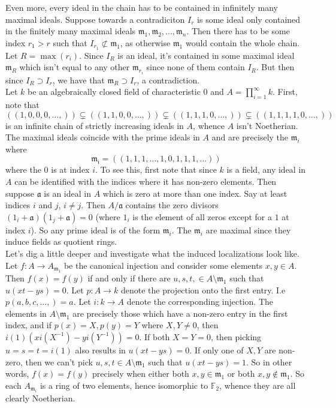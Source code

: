\documentclass{article}
\theoremstyle{definition}
\newcommand{\F}{\mathbb{F}}
\begin{document}
Even more, every ideal in the chain has to be contained in infinitely many
maximal ideals. Suppose towards a contradiciton $I_r$ is some ideal only
contained in the finitely many maximal ideals $\mathfrak{m}_1, \mathfrak{m}_2,
\ldots, \mathfrak{m}_n$. Then there has to be some index $r_1 > r$ such that
$I_{r_1} \not \subset \mathfrak{m}_1$, as otherwise $\mathfrak{m}_1$ would
contain the whole chain. Let $R = \max(r_i)$. Since $I_R$ is an ideal, it's
contained in some maximal ideal $\mathfrak{m}_R$ which isn't equal to any other
$\mathfrak{m}_{r_i}$ since none of them contain $I_R$. But then since $I_R
\supset I_r$, we have that $\mathfrak{m}_R \supset I_r$, a contradiction. \\

Let $k$ be an algebraically closed field of characteristic $0$ and $A =
\prod^{\infty}_{i = 1} k$. First, note that 
\[
	((1, 0, 0, 0, \ldots, ))
	\subsetneq
	((1, 1, 0, 0, \ldots, ))
	\subsetneq
	((1, 1, 1, 0, \ldots, ))
	\subsetneq
	((1, 1, 1, 1, 0, \ldots, ))
\] 
is an infinite chain of strictly increasing ideals in $A$, whence $A$ isn't
Noetherian. \\

The maximal ideals coincide with the prime ideals in $A$ and are precisely the
$\mathfrak{m}_i$ where 
\[
	\mathfrak{m_i} = ((1, 1, 1, \ldots, 1, 0, 1, 1, 1, \ldots))
\] 
where the $0$ is at index $i$. To see this, first note that since $k$ is a
field, any ideal in $A$ can be identified with the indices where it has
non-zero elements. Then suppose $\mathfrak{a}$ is an ideal in $A$ which is zero
at more than one index. Say at least indices $i$ and $j$, $i \not = j$. Then
$A/\mathfrak{a}$ contains the zero divisors $(1_i + \mathfrak{a})(1_j +
\mathfrak{a}) = 0$ (where $1_i$ is the element of all zeros except for a $1$ at
index $i$). So any prime ideal is of the form $\mathfrak{m}_i$. The
$\mathfrak{m}_i$ are maximal since they induce fields as quotient rings. \\

Let's dig a little deeper and investigate what the induced localizations look
like. Let $f : A \to A_{\mathfrak{m}_1}$ be the canonical injection and
consider some elements $x,  y \in A$. Then $f(x) = f(y)$ if and only if there
are $u, s, t, \in A \setminus \mathfrak{m}_1$ such that $u(xt - ys) = 0$. Let
$p : A \to k$ denote the projection onto the first entry. I.e $p(a, b, c,
\ldots,) = a$. Let $i : k \to A$ denote the corresponding injection. The
elements in $A \setminus \mathfrak{m}_{1}$ are precisely those which have a
non-zero entry in the first index, and if $p(x) = X, p(y) = Y$ where $X, Y \not
= 0$, then $i(1)(x i(X^{-1}) - y i(Y^{-1})) = 0$. If both $X = Y = 0$, then
picking $u = s = t = i(1)$ also results in $u(xt - ys) = 0$. If only one of $X,
Y$ are non-zero, then we can't pick $u, s, t \in A \setminus \mathfrak{m}_1$
such that $u(xt - ys) = 1$. So in other words, $f(x) = f(y)$ precisely when
either both $x, y \in \mathfrak{m}_1$ or both $x, y \not \in \mathfrak{m}_1$.
So each $A_{\mathfrak{m}_i}$ is a ring of two elements, hence isomorphic to
$\F_2$, whence they are all clearly Noetherian.
\end{document}
